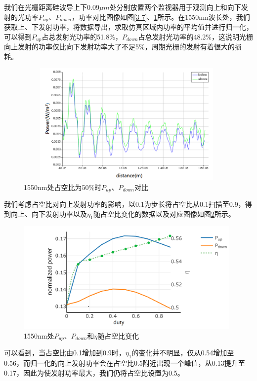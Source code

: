 \documentclass[UTF8,a4paper,12pt]{ctexart}
\numberwithin{equation}{section}
\begin{document}
我们在光栅距离硅波导上下0.09$\mu m$处分别放置两个监视器用于观测向上和向下发射的光功率$P_{up}$、$P_{down}$，功率对比图像如图\ref{3-7}、\ref{3-8}所示。在1550nm波长处，我们获取上、下发射功率，将数据导出，求取仿真区域内功率的平均值并进行归一化，可以得到$P_{up}$占总发射光功率的51.8\%，$P_{down}$占总发射光功率的48.2\%，这说明光栅向上发射的功率仅比向下发射功率大了不足5\%，周期光栅的发射有着很大的损耗。
\begin{figure}[htbp]
\centering
\includegraphics[height=6cm,width=11cm]{fig7.png}
\caption{1550nm处占空比为50\%时$P_{up}$、$P_{down}$对比}
\label{3-8}
\end{figure}


我们考虑占空比对向上发射功率的影响，以0.1为步长将占空比从0.1扫描至0.9，得到向上、向下发射功率以及$\eta_1$随占空比变化的数据以及对应图像如图\ref{3-9}所示。

\begin{figure}[htbp]
\centering
\includegraphics[height=5.5cm,width=11cm]{fig8.png}
\caption{1550nm处$P_{up}$、$P_{down}$和$\eta$随占空比变化}
\label{3-9}
\end{figure}

\noindent 可以看到，当占空比由0.1增加到0.9时，$\eta_1$的变化并不明显，仅从0.54增加至0.56，而归一化的向上发射功率会在占空比0.5附近出现一个峰值，从0.13提升至0.17，因此为使发射功率最大，我们仍将占空比设置为0.5。
\end{document}
